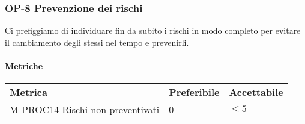 		\subsubsection{OP-8 Prevenzione dei rischi} 
			Ci prefiggiamo di individuare fin da subito i rischi in modo completo per evitare il cambiamento degli stessi nel tempo e prevenirli.
			\paragraph{Metriche} \mbox{} 
			\begin{longtable} {
					>{}p{80mm} 
					>{}p{25mm}
					>{}p{25mm}
				}
				\rowcolor{gray!50}
				\textbf{Metrica} & \textbf{Preferibile} & \textbf{Accettabile} \TBstrut \TBstrut \\
				M-PROC14 Rischi non preventivati & 0 & $ \le 5$ \TBstrut \\ [2mm]
			\end{longtable}
			

